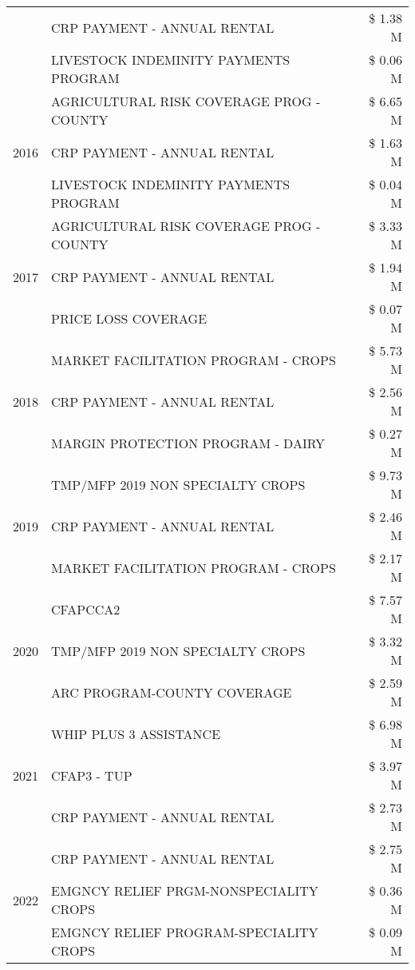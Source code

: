 \begin{tabular}{llr}
 & CRP PAYMENT - ANNUAL RENTAL & \$ 1.38 M \\
 & LIVESTOCK INDEMINITY PAYMENTS PROGRAM & \$ 0.06 M \\
\cline{1-3}
\multirow[t]{3}{*}{2016} & AGRICULTURAL RISK COVERAGE PROG - COUNTY & \$ 6.65 M \\
 & CRP PAYMENT - ANNUAL RENTAL & \$ 1.63 M \\
 & LIVESTOCK INDEMINITY PAYMENTS PROGRAM & \$ 0.04 M \\
\cline{1-3}
\multirow[t]{3}{*}{2017} & AGRICULTURAL RISK COVERAGE PROG - COUNTY & \$ 3.33 M \\
 & CRP PAYMENT - ANNUAL RENTAL & \$ 1.94 M \\
 & PRICE LOSS COVERAGE & \$ 0.07 M \\
\cline{1-3}
\multirow[t]{3}{*}{2018} & MARKET FACILITATION PROGRAM - CROPS & \$ 5.73 M \\
 & CRP PAYMENT - ANNUAL RENTAL & \$ 2.56 M \\
 & MARGIN PROTECTION PROGRAM - DAIRY & \$ 0.27 M \\
\cline{1-3}
\multirow[t]{3}{*}{2019} & TMP/MFP 2019 NON SPECIALTY CROPS & \$ 9.73 M \\
 & CRP PAYMENT - ANNUAL RENTAL & \$ 2.46 M \\
 & MARKET FACILITATION PROGRAM - CROPS & \$ 2.17 M \\
\cline{1-3}
\multirow[t]{3}{*}{2020} & CFAPCCA2 & \$ 7.57 M \\
 & TMP/MFP 2019 NON SPECIALTY CROPS & \$ 3.32 M \\
 & ARC PROGRAM-COUNTY COVERAGE & \$ 2.59 M \\
\cline{1-3}
\multirow[t]{3}{*}{2021} & WHIP PLUS 3 ASSISTANCE & \$ 6.98 M \\
 & CFAP3 - TUP & \$ 3.97 M \\
 & CRP PAYMENT - ANNUAL RENTAL & \$ 2.73 M \\
\cline{1-3}
\multirow[t]{3}{*}{2022} & CRP PAYMENT - ANNUAL RENTAL & \$ 2.75 M \\
 & EMGNCY RELIEF PRGM-NONSPECIALITY CROPS & \$ 0.36 M \\
 & EMGNCY RELIEF PROGRAM-SPECIALITY CROPS & \$ 0.09 M \\
\cline{1-3}
\bottomrule
\end{tabular}
